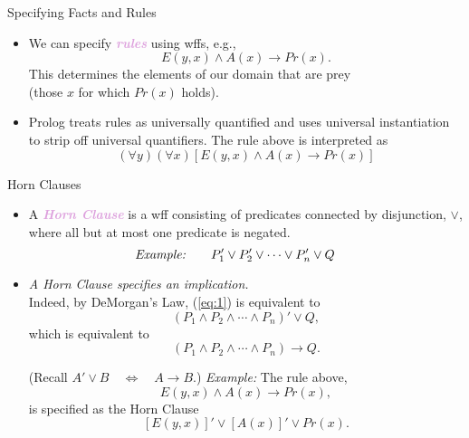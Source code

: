 \documentclass[xcolor=dvipsnames,9pt,hide notes]{beamer}
\newcommand{\meet}{\ensuremath{\wedge}}
\newcommand{\join}{\ensuremath{\vee}}
\theoremstyle{definition}
\theoremstyle{remark}
\numberwithin{theorem}{section}
\numberwithin{claim}{section}
\numberwithin{equation}{section}
\numberwithin{conjecture}{section}
\newcommand{\defn}[1]{\textcolor{Plum}{\textit{\textbf{#1}}}}
\begin{document}
\begin{frame}[shrink=5]{Specifying Facts and Rules}
\begin{itemize}
\item<3-> We can specify \defn{rules} using wffs, e.g.,  
      \[E(y, x) \meet A(x) \rightarrow Pr(x). \]
      This determines the elements of our domain that are prey\\ (those $x$ for which
      $Pr(x)$ holds).
    \item<4-> Prolog treats rules
      as universally quantified and uses universal instantiation to strip off
      universal quantifiers.  The rule above is interpreted as
      \[
      (\forall y)(\forall x)[E(y, x) \meet A(x) \rightarrow Pr(x)]
      \]

  \end{itemize}
\end{frame}
\begin{frame}{Horn Clauses}
  \begin{itemize}
      \item A \defn{Horn Clause} is a wff consisting of
        predicates connected by disjunction, $\join$, where all but at most one
        predicate is negated.
        \begin{equation}
          \label{eq:1}
\hskip-6mm \text{{\it Example:}} \qquad       P_1' \join P_2' \join \cdots \join P_n' \join Q
        \end{equation}
\item<2-> \emph{A Horn Clause specifies an implication.}\\[5pt]
 Indeed, by DeMorgan's Law, (\ref{eq:1})
  is equivalent to
        \[
        (P_1 \meet P_2 \meet \cdots \meet P_n)' \join Q,
        \]
which is equivalent to
        \[
        (P_1 \meet P_2 \meet \cdots \meet P_n) \longrightarrow Q.
        \]
        \begin{overprint}
         (Recall $A'\join B \quad \Longleftrightarrow \quad A
         \longrightarrow B$.)
         \emph{Example:} The rule above,
         \[E(y, x) \meet A(x) \rightarrow Pr(x), \]
         is specified as the Horn Clause
         \[ [E(y, x)]' \join [A(x)]' \join Pr(x).\]
        \end{overprint}
      \end{itemize}
    \end{frame}
\end{document}

